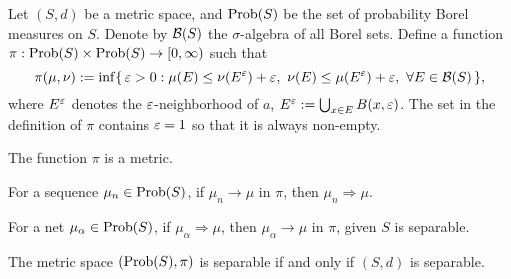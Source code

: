 \documentclass{../../small}
\begin{document}
\begin{thm}
Let $(S,d)$ be a metric space, and $\operatorname{Prob}(S)$ be the set of probability Borel measures on $S$.
Denote by $\mathcal{B}(S)$ the $\sigma$-algebra of all Borel sets.
Define a function $\pi:\operatorname{Prob}(S)\times\operatorname{Prob}(S)\to[0,\infty)$ such that
\[\pi(\mu,\nu):=\inf\{\,\e>0:\mu(E)\le\nu(E^\e)+\e,\ \nu(E)\le\mu(E^\e)+\e,\ \forall E\in\cB(S)\,\},\]
where $E^\varepsilon$ denotes the $\varepsilon$-neighborhood of $a$, $E^\varepsilon:=\bigcup_{x\in E}B(x,\varepsilon)$.
The set in the definition of $\pi$ contains $\varepsilon=1$ so that it is always non-empty.
\begin{parts}
\item The function $\pi$ is a metric.
\item For a sequence $\mu_n\in\operatorname{Prob}(S)$, if $\mu_n\to\mu$ in $\pi$, then $\mu_n\Rightarrow\mu$.
\item For a net $\mu_\alpha\in\operatorname{Prob}(S)$, if $\mu_\alpha\Rightarrow\mu$, then $\mu_\alpha\to\mu$ in $\pi$, given $S$ is separable.
\item The metric space $(\operatorname{Prob}(S),\pi)$ is separable if and only if $(S,d)$ is separable.
\end{parts}
\end{thm}
\end{document}
